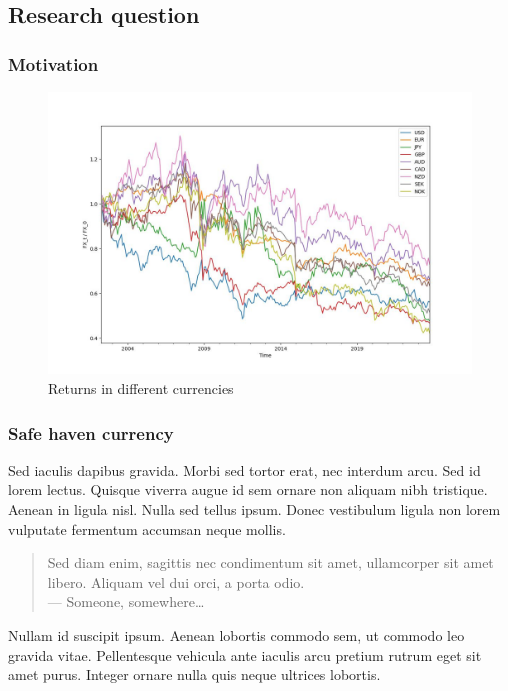 \documentclass[11pt,]{beamer}
\begin{document}
\subsection{Research question}
\begin{frame}
	\frametitle{Motivation}
	\begin{figure}
		\includegraphics[width=0.8\linewidth]{figures/ccy_perfs.jpg}
		\caption{Returns in different currencies}
	\end{figure}
\end{frame}
\begin{frame}
    \frametitle{Safe haven currency}
	
	Sed iaculis \alert{dapibus gravida}. Morbi sed tortor erat, nec interdum arcu. Sed id lorem lectus. Quisque viverra augue id sem ornare non aliquam nibh tristique. Aenean in ligula nisl. Nulla sed tellus ipsum. Donec vestibulum ligula non lorem vulputate fermentum accumsan neque mollis.
	
	\bigskip
	
	\begin{quote}
		Sed diam enim, sagittis nec condimentum sit amet, ullamcorper sit amet libero. Aliquam vel dui orci, a porta odio.\\
		--- Someone, somewhere\ldots
	\end{quote}
	
	\bigskip %
	
	Nullam id suscipit ipsum. Aenean lobortis commodo sem, ut commodo leo gravida vitae. Pellentesque vehicula ante iaculis arcu pretium rutrum eget sit amet purus. Integer ornare nulla quis neque ultrices lobortis.
\end{frame}
\end{document}

